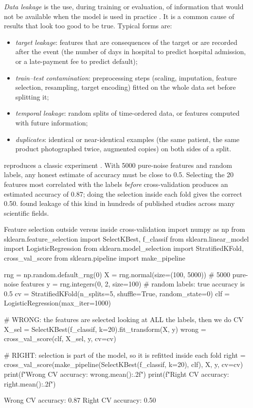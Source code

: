 \emph{Data leakage} is the use, during training or evaluation, of information that would not
be available when the model is used in practice \citep{kaufman2012leakage}. It is a common cause of results that look too good to be true. Typical forms are:
\begin{itemize}
  \item \emph{target leakage}: features that are consequences of the target or are recorded
        after the event (the number of days in hospital to predict hospital admission, or a
        late-payment fee to predict default);
  \item \emph{train--test contamination}: preprocessing steps (scaling, imputation, feature
        selection, resampling, target encoding) fitted on the whole data set before
        splitting it;
  \item \emph{temporal leakage}: random splits of time-ordered data, or features computed
        with future information;
  \item \emph{duplicates}: identical or near-identical examples (the same patient, the same
        product photographed twice, augmented copies) on both sides of a split.
\end{itemize}
 reproduces a classic experiment \citep[Section~7.10.2]{hastie2009elements}.
With 5000 pure-noise features and random labels, any honest estimate of accuracy must be
close to 0.5. Selecting the 20 features most correlated with the labels \emph{before}
cross-validation produces an estimated accuracy of 0.87; doing the selection inside each fold
gives the correct 0.50. \citet{kapoor2023leakage} found leakage of this kind in hundreds of
published studies across many scientific fields.

\begin{pylisting}[label={lst:leakage}]{Feature selection outside versus inside cross-validation}
import numpy as np
from sklearn.feature_selection import SelectKBest, f_classif
from sklearn.linear_model import LogisticRegression
from sklearn.model_selection import StratifiedKFold, cross_val_score
from sklearn.pipeline import make_pipeline

rng = np.random.default_rng(0)
X = rng.normal(size=(100, 5000))    # 5000 pure-noise features
y = rng.integers(0, 2, size=100)    # random labels: true accuracy is 0.5
cv = StratifiedKFold(n_splits=5, shuffle=True, random_state=0)
clf = LogisticRegression(max_iter=1000)

# WRONG: the features are selected looking at ALL the labels, then we do CV
X_sel = SelectKBest(f_classif, k=20).fit_transform(X, y)
wrong = cross_val_score(clf, X_sel, y, cv=cv)

# RIGHT: selection is part of the model, so it is refitted inside each fold
right = cross_val_score(make_pipeline(SelectKBest(f_classif, k=20), clf), X, y, cv=cv)
print(f"Wrong CV accuracy: {wrong.mean():.2f}")
print(f"Right CV accuracy: {right.mean():.2f}")
\end{pylisting}
\begin{pyoutput}
Wrong CV accuracy: 0.87
Right CV accuracy: 0.50
\end{pyoutput}

